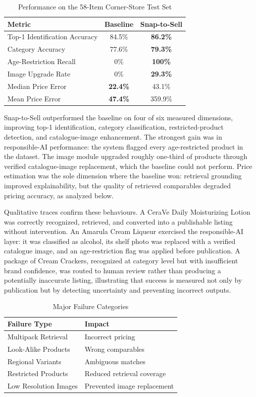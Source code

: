 \documentclass[conference]{IEEEtran}
\begin{document}
\begin{table}[t]
\caption{Performance on the 58-Item Corner-Store Test Set}
\label{tab:results}
\centering
\begin{tabular}{@{}lcc@{}}
\toprule
Metric & Baseline & Snap-to-Sell \\
\midrule
Top-1 Identification Accuracy & 84.5\% & \textbf{86.2\%} \\
Category Accuracy & 77.6\% & \textbf{79.3\%} \\
Age-Restriction Recall & 0\% & \textbf{100\%} \\
Image Upgrade Rate & 0\% & \textbf{29.3\%} \\
Median Price Error & \textbf{22.4\%} & 43.1\% \\
Mean Price Error & \textbf{47.4\%} & 359.9\% \\
\bottomrule
\end{tabular}
\end{table}

Snap-to-Sell outperformed the baseline on four of six measured dimensions,
improving top-1 identification, category classification, restricted-product
detection, and catalogue-image enhancement. The strongest gain was in
responsible-AI performance: the system flagged every age-restricted product in
the dataset. The image module upgraded roughly one-third of products through
verified catalogue-image replacement, which the baseline could not perform.
Price estimation was the sole dimension where the baseline won: retrieval
grounding improved explainability, but the quality of retrieved comparables
degraded pricing accuracy, as analyzed below.

Qualitative traces confirm these behaviours. A CeraVe Daily Moisturizing Lotion
was correctly recognized, retrieved, and converted into a publishable listing
without intervention. An Amarula Cream Liqueur exercised the responsible-AI
layer: it was classified as alcohol, its shelf photo was replaced with a
verified catalogue image, and an age-restriction flag was applied before
publication. A package of Cream Crackers, recognized at category level but with
insufficient brand confidence, was routed to human review rather than producing
a potentially inaccurate listing, illustrating that success is measured not
only by publication but by detecting uncertainty and preventing incorrect
outputs.

\begin{table}[t]
\caption{Major Failure Categories}
\label{tab:failures}
\centering
\begin{tabular}{ll}
\toprule
Failure Type & Impact \\
\midrule
Multipack Retrieval & Incorrect pricing \\
Look-Alike Products & Wrong comparables \\
Regional Variants & Ambiguous matches \\
Restricted Products & Reduced retrieval coverage \\
Low Resolution Images & Prevented image replacement \\
\bottomrule
\end{tabular}
\end{table}
\end{document}
